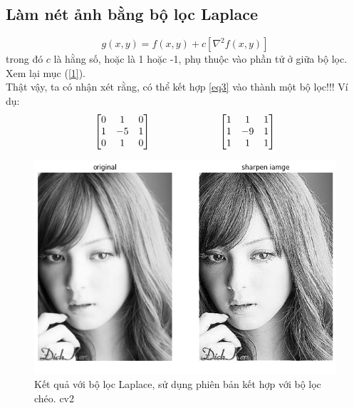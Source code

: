 \documentclass{article}
\begin{document}
    \subsection{Làm nét ảnh bằng bộ lọc Laplace}
    \begin{equation}
        g(x,y) = f(x,y) + c \left[\nabla^2f(x,y) \right]
        \label{eq3}
    \end{equation}
    trong đó $c$ là hằng số, hoặc là 1 hoặc -1, phụ thuộc vào phần tử ở giữa bộ lọc. Xem lại mục (\ref{1}). \\
    Thật vậy, ta có nhận xét rằng, có thể kết hợp \ref{eq3} vào thành một bộ lọc!!! Ví dụ:
    $$
    \begin{bmatrix}
        0 & 1 & 0\\
        1  & -5 & 1\\
        0 & 1 & 0
    \end{bmatrix}
    \hspace{0.2\textwidth}
    \begin{bmatrix}
    1 & 1 & 1\\
    1 & -9 & 1 \\
    1 & 1 & 1
    \end{bmatrix}
    $$
    \begin{figure}[ht!]
        \centering
        \includegraphics[width =\linewidth]{download (7).png}
        \caption{Kết quả với bộ lọc Laplace, sử dụng phiên bản kết hợp với bộ lọc chéo. cv2}
        \label{fig13}
    \end{figure}
\end{document}
